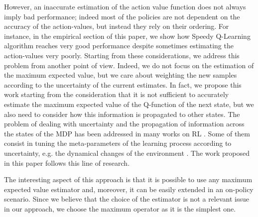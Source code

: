 \documentclass[conference]{IEEEtran}
\begin{document}
However, an inaccurate estimation of the action value function does not always imply bad performance; indeed most of the policies are not dependent on the accuracy of the action-values, but instead they rely on their ordering. For instance, in the empirical section of this paper, we show how Speedy Q-Learning algorithm \cite{NIPS2011_4251} reaches very good performance despite sometimes estimating the action-values very poorly. Starting from these considerations, we address this problem from another point of view. Indeed, we do not focus on the estimation of the maximum expected value, but we care about weighting the new samples according to the uncertainty of the current estimates. 
In fact, we propose this work starting from the consideration that it is not sufficient to accurately estimate the maximum expected value of the Q-function of the next state, but we also need to consider how this information is propagated to other states. The problem of dealing with uncertainty and the propagation of information across the states of the MDP has been addressed in many works on RL \cite{mohagheghi2007proportional, Tewari2007}. Some of them consist in tuning the meta-parameters of the learning process according to uncertainty, e.g. the dynamical changes of the environment \cite{schweighofer2003meta, Kobayashi2009, yoshida2013reinforcement}.
The work proposed in this paper follows this line of research.

The interesting aspect of this approach is that it is possible to use any maximum expected value estimator and, moreover, it can be easily extended in an on-policy scenario. Since we believe that the choice of the estimator is not a relevant issue in our approach, we choose the maximum operator as it is the simplest one.
\end{document}
